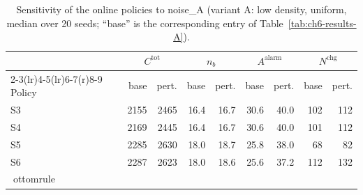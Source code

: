 \begin{table}[htbp]
\centering
\caption{Sensitivity of the online policies to noise_A (variant A: low density, uniform,
median over 20 seeds; ``base'' is the corresponding entry of
Table~\ref{tab:ch6-results-A}).}
\label{tab:ch6-sens-A-noise}
\footnotesize
\begin{tabular}{@{}l rr rr rr rr@{}}
\toprule
& \multicolumn{2}{c}{$C^{\mathrm{tot}}$} & \multicolumn{2}{c}{$n_b$}
  & \multicolumn{2}{c}{$A^{\mathrm{alarm}}$} & \multicolumn{2}{c}{$N^{\mathrm{chg}}$} \\
\cmidrule(r){2-3}\cmidrule(lr){4-5}\cmidrule(lr){6-7}\cmidrule(r){8-9}
Policy & base & pert. & base & pert. & base & pert. & base & pert. \\
\midrule

S3 & 2155 & 2465 & 16.4 & 16.7 & 30.6 & 40.0 & 102 & 112 \\
S4 & 2169 & 2445 & 16.4 & 16.7 & 30.6 & 40.0 & 101 & 112 \\
S5 & 2285 & 2630 & 18.0 & 18.7 & 25.8 & 38.0 & 68 & 82 \\
S6 & 2287 & 2623 & 18.0 & 18.6 & 25.6 & 37.2 & 112 & 132 \\
ottomrule
\end{tabular}
\end{table}
